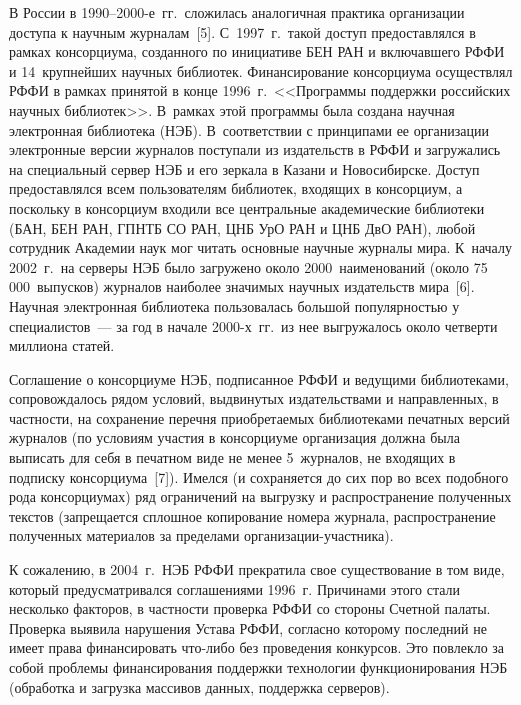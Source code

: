 \begin{multicols}{2}
В России в 1990--2000-е~гг.\ сложилась аналогичная практика 
организации доступа к научным журналам~[5]. С~1997~г.\ такой доступ 
предоставлялся в рамках консорциума, созданного по инициативе БЕН РАН 
и включавшего \mbox{РФФИ} и 
14~крупнейших научных биб\-лио\-тек. Финансирование консорциума 
осуществлял \mbox{РФФИ} в рамках принятой в конце 1996~г.\ <<Программы 
поддержки российских научных биб\-лио\-тек>>. В~рамках этой программы 
была создана научная электронная биб\-лио\-те\-ка (НЭБ). В~соответствии с 
принципами ее организации электронные версии журналов поступали из 
издательств в \mbox{РФФИ} и загружались на специальный сервер НЭБ и его 
зеркала в Казани и Новосибирске. Доступ предоставлялся всем 
пользователям биб\-лио\-тек, входящих в консорциум, а поскольку в 
консорциум входили все центральные академические биб\-лио\-те\-ки (БАН, БЕН 
РАН, \mbox{ГПНТБ} СО РАН, ЦНБ УрО РАН и ЦНБ ДвО РАН), любой сотрудник 
Академии наук мог читать основные научные журналы мира. К~началу 
2002~г.\ на серверы НЭБ было загружено около 2000~наименований (около 
75\,000~выпусков) журналов наиболее значимых научных издательств 
мира~[6]. Научная электронная библиотека пользовалась большой популярностью у специалистов~--- за 
год в начале \mbox{2000-х}~гг.\ из нее выгружалось около четверти миллиона 
статей. 
     
     Соглашение о консорциуме НЭБ, подписанное РФФИ и ведущими 
биб\-лио\-те\-ка\-ми, сопровождалось рядом условий, выдвинутых издательствами 
и направленных, в частности, на сохранение перечня приобретаемых 
биб\-лио\-те\-ка\-ми печатных версий журналов (по условиям участия в 
консорциуме организация должна была выписать для себя в печатном виде 
не менее 5~журналов, не входящих в подписку консорциума~[7]). Имелся (и 
сохраняется до сих пор во всех подобного рода консорциумах) ряд 
ограничений на выгрузку и распространение полученных текстов 
(запрещается сплошное копирование номера журнала, распространение 
полученных материалов за пределами ор\-га\-ни\-за\-ции-участ\-ника).
     
     К сожалению, в 2004~г.\ НЭБ РФФИ прекратила свое существование в 
том виде, который преду\-смат\-ри\-вал\-ся соглашениями 1996~г. Причинами 
этого стали несколько факторов, в частности проверка РФФИ со стороны 
Счетной палаты. Проверка вы\-яви\-ла нарушения Устава РФФИ, согласно 
которому последний не имеет права финансировать что-ли\-бо без 
проведения конкурсов. Это по\-влек\-ло за собой проблемы финансирования 
поддержки технологии функционирования НЭБ (обработка и загрузка 
массивов данных, поддержка серверов). 


\end{multicols}
